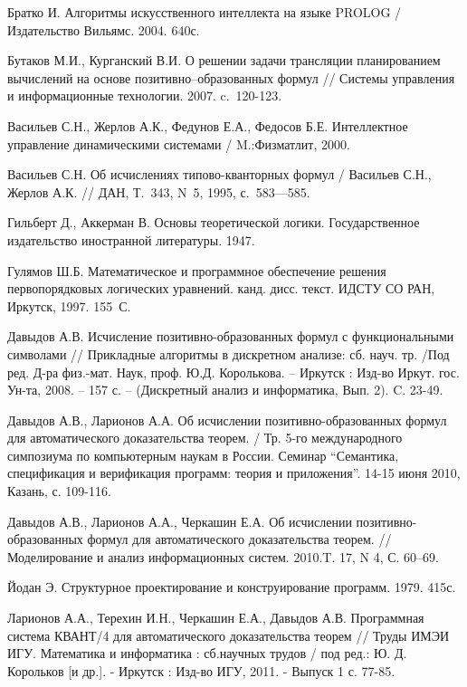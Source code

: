 \begin{thebibliography}{99}

%
%

 Братко И. Алгоритмы искусственного интеллекта на языке PROLOG / Издательство Вильямс. 2004. 640с.

 Бутаков М.И., Курганский В.И. О решении задачи трансляции планированием вычислений на основе позитивно--образованных формул // Системы управления и информационные технологии. 2007. c.~120-123.

 Васильев С.Н., Жерлов А.К., Федунов Е.А., Федосов Б.Е.  Интеллектное управление динамическими системами /  M.:Физматлит, 2000.

 Васильев С.Н. Об исчислениях типово-кванторных формул / Васильев С.Н., Жерлов А.К.  // ДАН, Т.~343, N~5, 1995, с.~583---585.

 Гильберт Д., Аккерман В. Основы теоретической логики. Государственное издательство иностранной литературы. 1947.

 Гулямов Ш.Б. Математическое и программное обеспечение решения первопорядковых логических уравнений. канд. дисс. текст. ИДСТУ СО РАН, Иркутск, 1997. 155~С.

 Давыдов А.В. Исчисление позитивно-образованных формул с функциональными символами // Прикладные алгоритмы в дискретном анализе: сб. науч. тр. /Под ред. Д-ра физ.-мат. Наук, проф. Ю.Д. Королькова. – Иркутск : Изд-во Иркут. гос. Ун-та, 2008. – 157 с. – (Дискретный анализ и информатика, Вып. 2). C. 23-49.


 Давыдов А.В., Ларионов А.А. Об исчислении позитивно-образованных формул для автоматического доказательства теорем. / Тр. 5-го международного симпозиума по компьютерным наукам в России. Семинар ``Семантика, спецификация и верификация программ: теория и приложения''. 14-15 июня 2010, Казань, с. 109-116.

 Давыдов А.В., Ларионов А.А., Черкашин Е.А. Об исчислении позитивно-образованных формул для автоматического доказательства теорем. // Моделирование и анализ информационных систем. 2010.T. 17, N 4, С. 60--69.



 Йодан Э. Структурное проектирование и конструирование программ. 1979. 415с.

 Ларионов А.А., Терехин И.Н., Черкашин Е.А., Давыдов А.В. Программная система КВАНТ/4 для автоматического доказательства теорем // Труды ИМЭИ ИГУ. Математика и информатика : сб.научных трудов / под ред.: Ю. Д. Корольков [и др.]. - Иркутск : Изд-во ИГУ, 2011. - Выпуск 1 с. 77-85.


\end{thebibliography}
